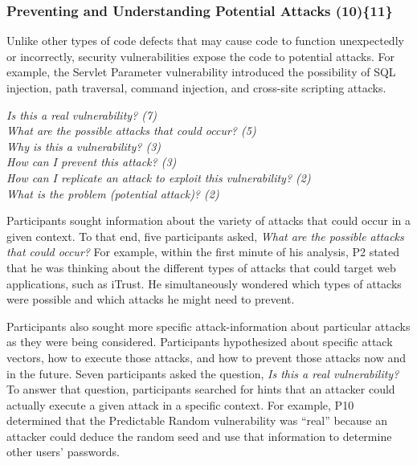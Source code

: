\documentclass{acm_proc_article-sp}
\begin{document}

\subsubsection{\textbf{Preventing and Understanding Potential Attacks (10)\{11\}}}\label{pupa}
Unlike other types of code defects that may cause code to function unexpectedly or incorrectly, security vulnerabilities expose the code to potential attacks. For example, the Servlet Parameter vulnerability introduced the possibility of SQL injection, path traversal, command injection, and cross-site scripting attacks.


\noindent\emph{Is this a real vulnerability? (7)} \\
\emph{What are the possible attacks that could occur? (5)} \\
\emph{Why is this a vulnerability? (3)} \\
\emph{How can I prevent this attack? (3)} \\
\emph{How can I replicate an attack to exploit this vulnerability? (2)} \\
\emph{What is the problem (potential attack)? (2)} 

 
Participants sought information about the variety of attacks that could occur in a given context.
To that end, five participants asked, \textit{What are the possible attacks that could occur?}
For example, within the first minute of his analysis, P2 stated that he was thinking about the different types of attacks that could target web applications, such as iTrust. He simultaneously wondered which types of attacks were possible and which attacks he might need to prevent.

Participants also sought more specific attack-information about particular attacks as they were being considered.
Participants hypothesized about specific attack vectors, how to execute those attacks, and how to prevent those attacks now and in the future.
Seven participants asked the question, \textit{Is this a real vulnerability?} To answer that question, participants searched for hints that an attacker could actually execute a given attack in a specific context. For example, P10 determined that the Predictable Random vulnerability was ``real'' because an attacker could deduce the random seed and use that information to determine other users' passwords. 
\end{document}
